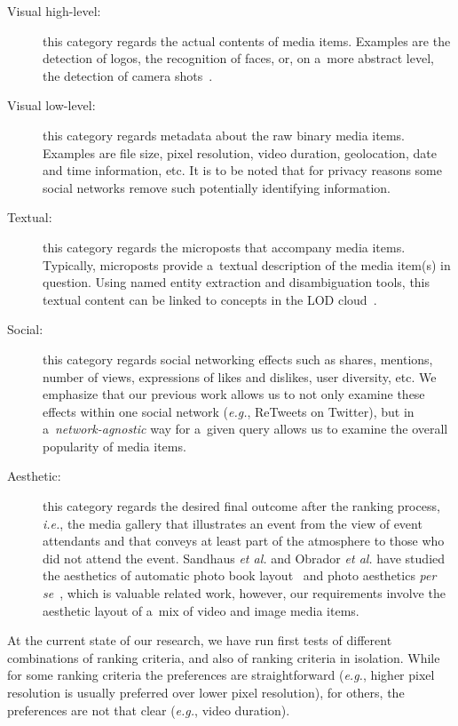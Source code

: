 \documentclass[runningheads,a4paper,11pt]{llncs}
\begin{document}
\begin{description}
\item[Visual high-level:]
this category regards the actual contents of media items.
Examples are the detection of logos, the recognition of faces, or, on a~more abstract level,
the detection of camera shots~\cite{Crowdsourcing2011}.

\item[Visual low-level:]
this category regards metadata about the raw binary media items.
Examples are file size, pixel resolution, video duration, geolocation,
date and time information, etc.
It is to be noted that for privacy reasons some social networks
remove such potentially identifying information.

\item[Textual:]
this category regards the microposts that accompany media items.
Typically, microposts provide a~textual description of the media item(s) in question.
Using named entity extraction and disambiguation tools,
this textual content can be linked to concepts in the LOD cloud~\cite{Facebook2011}.

\item[Social:]
this category regards social networking effects such as shares, mentions,
number of views, expressions of likes and dislikes, user diversity, etc.
We emphasize that our previous work allows us
to not only examine these effects within one social network (\emph{e.g.}, ReTweets on Twitter),
but in a~\emph{network-agnostic} way for a~given query allows us
to examine the overall popularity of media items.

\item[Aesthetic:]
this category regards the desired final outcome after the ranking process, \emph{i.e.},
the media gallery that illustrates an event from the view of event attendants and
that conveys at least part of the atmosphere to those who did not attend the event.
Sandhaus \emph{et al.} and Obrador \emph{et al.} have studied the aesthetics of
automatic photo book layout~\cite{Photo2011}
and photo aesthetics \emph{per se}~\cite{Photo2012}, which is valuable related work, however,
our requirements involve the aesthetic layout of a~mix of video and image media items.
\end{description}

\noindent At the current state of our research, we have run first tests of different combinations
of ranking criteria, and also of ranking criteria in isolation.
While for some ranking criteria the preferences are straightforward
(\emph{e.g.}, higher pixel resolution is usually preferred over lower pixel resolution),
for others, the preferences are not that clear (\emph{e.g.}, video duration).
\end{document}
